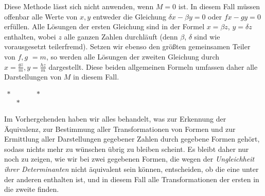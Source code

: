 Diese Methode lässt sich nicht anwenden, wenn $M=0$ ist. In diesem Fall müssen offenbar alle Werte von $x,y$ entweder die Gleichung $\delta x-\beta y=0$ oder $fx-gy=0$ erfüllen. Alle Lösungen der ersten Gleichung sind in der Formel $x=\beta z$, $y=\delta z$ enthalten, wobei $z$ alle ganzen Zahlen durchläuft (denn $\beta$, $\delta$ sind wie vorausgesetzt teilerfremd). Setzen wir ebenso den größten gemeinsamen Teiler von $f,g$ $=m$, so werden alle Lösungen der zweiten Gleichung durch $x=\frac{gz}{m},y=\frac{hz}{m}$ dargestellt. Diese beiden allgemeinen Formeln umfassen daher alle Darstellungen von $M$ in diesem Fall.

\begin{center}
\(\begin{matrix} *&\qquad&*\\[-0.8ex]&*&\end{matrix}\)
\end{center}

Im Vorhergehenden haben wir alles behandelt, was zur Erkennung der Äquivalenz, zur Bestimmung aller Transformationen von Formen und zur Ermittlung aller Darstellungen gegebener Zahlen durch gegebene Formen gehört, sodass nichts mehr zu wünschen übrig zu bleiben scheint. Es bleibt daher nur noch zu zeigen, wie wir bei zwei gegebenen Formen, die wegen der \textit{Ungleichheit ihrer Determinanten} nicht äquivalent sein können, entscheiden, ob die eine unter der anderen enthalten ist, und in diesem Fall alle Transformationen der ersten in die zweite finden.

